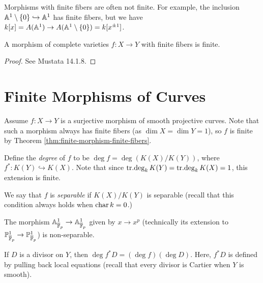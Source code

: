 \begin{remark}
  Morphisms with finite fibers are often not
  finite. For example, the inclusion
  $\mathbb{A}^1 \setminus \{0\} \hookrightarrow \mathbb{A}^1$
  has finite fibers, but
  we have $k[x] = A(\mathbb{A}^1) \to A(\mathbb{A}^1 \setminus \{0\}) = k[x^{\pm 1}]$.
\end{remark}

\begin{theorem}\label{thm:finite-morphism-finite-fibers}
  A morphism of complete varieties
  $f : X \to Y$ with finite fibers is finite.
\end{theorem}

\begin{proof}
  See Mustata 14.1.8.
\end{proof}

\section{Finite Morphisms of Curves}

\begin{remark}
  Assume $f : X \to Y$ is a surjective
  morphism of smooth projective curves. Note
  that such a morphism always has
  finite fibers (as $\dim X = \dim Y = 1$),
  so $f$ is finite by
  Theorem \ref{thm:finite-morphism-finite-fibers}.
\end{remark}

\begin{definition}
  Define the \emph{degree} of $f$ to be
  $\deg f = \deg (K(X) / K(Y))$,
  where $f^* : K(Y) \hookrightarrow K(X)$.
  Note that since
  $\operatorname{tr{.}deg}_k K(Y) = \operatorname{tr{.}deg}_k K(X) = 1$,
  this extension is finite.
\end{definition}

\begin{definition}
  We say that $f$ is \emph{separable}
  if $K(X) / K(Y)$ is separable (recall that this
  condition always
  holds when $\operatorname{char} k = 0$.)
\end{definition}

\begin{example}
  The morphism
    $\mathbb{A}^1_{\overline{\mathbb{F}}_p} \to \mathbb{A}^1_{\overline{\mathbb{F}}_p}$
  given by $x \to x^p$
  (technically its extension to
  $\mathbb{P}^1_{\overline{\mathbb{F}}_p} \to \mathbb{P}^1_{\overline{\mathbb{F}}_p}$)
  is non-separable.
\end{example}

\begin{prop}
  If $D$ is a divisor on $Y$, then
  $\deg f^* D = (\deg f)(\deg D)$. Here,
  $f^* D$ is defined by pulling back
  local equations (recall that every divisor
  is Cartier when $Y$ is smooth).
\end{prop}

